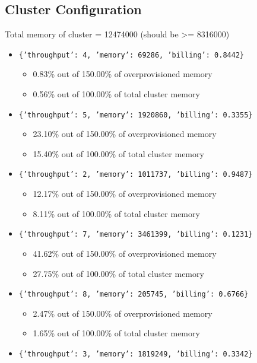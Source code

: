 \documentclass[]{interact}
\theoremstyle{plain}
\theoremstyle{definition}
\theoremstyle{remark}
\begin{document}
\subsection{Cluster Configuration}
Total memory of cluster = 12474000 (should be >= 8316000)
\begin{itemize}
    \item \texttt{\{'throughput': 4, 'memory': 69286, 'billing': 0.8442\}}
    \begin{itemize}
        \item 0.83\% out of 150.00\% of overprovisioned memory
        \item 0.56\% out of 100.00\% of total cluster memory
    \end{itemize}
    \item \texttt{\{'throughput': 5, 'memory': 1920860, 'billing': 0.3355\}}
    \begin{itemize}
        \item 23.10\% out of 150.00\% of overprovisioned memory
        \item 15.40\% out of 100.00\% of total cluster memory
    \end{itemize}
    \item \texttt{\{'throughput': 2, 'memory': 1011737, 'billing': 0.9487\}}
    \begin{itemize}
        \item 12.17\% out of 150.00\% of overprovisioned memory
        \item 8.11\% out of 100.00\% of total cluster memory
    \end{itemize}
    \item \texttt{\{'throughput': 7, 'memory': 3461399, 'billing': 0.1231\}}
    \begin{itemize}
        \item 41.62\% out of 150.00\% of overprovisioned memory
        \item 27.75\% out of 100.00\% of total cluster memory
    \end{itemize}
    \item \texttt{\{'throughput': 8, 'memory': 205745, 'billing': 0.6766\}}
    \begin{itemize}
        \item 2.47\% out of 150.00\% of overprovisioned memory
        \item 1.65\% out of 100.00\% of total cluster memory
    \end{itemize}
    \item \texttt{\{'throughput': 3, 'memory': 1819249, 'billing': 0.3342\}}

\end{itemize}
\end{document}
